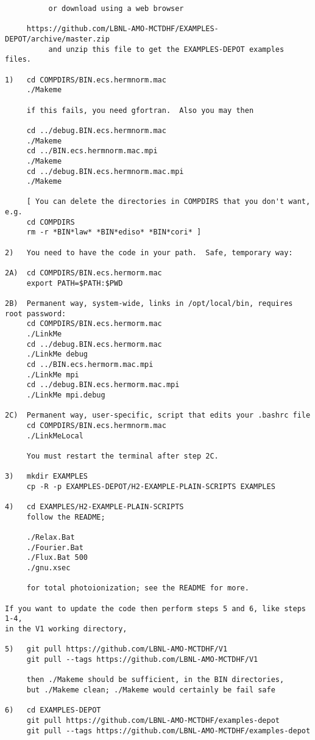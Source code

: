 \begin{verbatim}
          or download using a web browser

     https://github.com/LBNL-AMO-MCTDHF/EXAMPLES-DEPOT/archive/master.zip
          and unzip this file to get the EXAMPLES-DEPOT examples files.

1)   cd COMPDIRS/BIN.ecs.hermnorm.mac
     ./Makeme

     if this fails, you need gfortran.  Also you may then

     cd ../debug.BIN.ecs.hermnorm.mac
     ./Makeme
     cd ../BIN.ecs.hermnorm.mac.mpi
     ./Makeme
     cd ../debug.BIN.ecs.hermnorm.mac.mpi
     ./Makeme

     [ You can delete the directories in COMPDIRS that you don't want, e.g.
     cd COMPDIRS
     rm -r *BIN*law* *BIN*ediso* *BIN*cori* ]

2)   You need to have the code in your path.  Safe, temporary way:

2A)  cd COMPDIRS/BIN.ecs.hermorm.mac
     export PATH=$PATH:$PWD

2B)  Permanent way, system-wide, links in /opt/local/bin, requires root password:
     cd COMPDIRS/BIN.ecs.hermorm.mac
     ./LinkMe
     cd ../debug.BIN.ecs.hermorm.mac
     ./LinkMe debug
     cd ../BIN.ecs.hermorm.mac.mpi
     ./LinkMe mpi
     cd ../debug.BIN.ecs.hermorm.mac.mpi
     ./LinkMe mpi.debug

2C)  Permanent way, user-specific, script that edits your .bashrc file
     cd COMPDIRS/BIN.ecs.hermnorm.mac
     ./LinkMeLocal

     You must restart the terminal after step 2C.

3)   mkdir EXAMPLES
     cp -R -p EXAMPLES-DEPOT/H2-EXAMPLE-PLAIN-SCRIPTS EXAMPLES

4)   cd EXAMPLES/H2-EXAMPLE-PLAIN-SCRIPTS
     follow the README; 

     ./Relax.Bat
     ./Fourier.Bat 
     ./Flux.Bat 500
     ./gnu.xsec

     for total photoionization; see the README for more.
 
If you want to update the code then perform steps 5 and 6, like steps 1-4, 
in the V1 working directory,

5)   git pull https://github.com/LBNL-AMO-MCTDHF/V1
     git pull --tags https://github.com/LBNL-AMO-MCTDHF/V1

     then ./Makeme should be sufficient, in the BIN directories,
     but ./Makeme clean; ./Makeme would certainly be fail safe

6)   cd EXAMPLES-DEPOT
     git pull https://github.com/LBNL-AMO-MCTDHF/examples-depot
     git pull --tags https://github.com/LBNL-AMO-MCTDHF/examples-depot


\end{verbatim}
